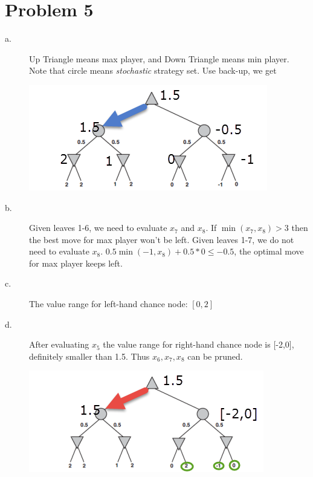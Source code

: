 \documentclass{mcmthesis}
\begin{document}
\section{Problem 5}
\begin{description}
	\item[a.] Up Triangle means max player, and Down Triangle means min player. Note that circle  means \textit{stochastic} strategy set. Use back-up, we get
	
	\includegraphics[width=.5\columnwidth]{fig4}
	\item[b.] Given leaves 1-6, we need to evaluate $x_7$ and $x_8$. If $\min(x_7,x_8)>3$ then the best move for max player won't be left. Given leaves 1-7, we do not need to evaluate $x_8$. $0.5\min(-1,x_8)+0.5*0\le -0.5$, the optimal move for max player keeps left.
	\item[c.] The value range for left-hand chance node: $[0,2]$
	\item[d.] After evaluating $x_5$ the value range for right-hand chance node is [-2,0], definitely smaller than 1.5. Thus $x_6,x_7,x_8$ can be pruned. 
	
	\includegraphics[width=.5\columnwidth]{fig5}
\end{description}


%
	
\end{document}
